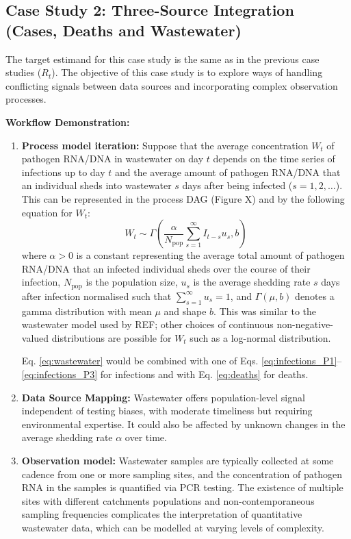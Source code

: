 \documentclass{article}
\begin{document}
\subsection{Case Study 2: Three-Source Integration (Cases, Deaths and Wastewater)}

The target estimand for this case study is the same as in the previous case studies ($R_t$). The objective of this case study is to explore ways of handling conflicting signals between data sources and incorporating complex observation processes.

\textbf{Workflow Demonstration:}
\begin{enumerate}
    \item \textbf{Process model iteration:} 
    Suppose that the average concentration $W_t$ of pathogen RNA/DNA in wastewater on day $t$ depends on the time series of infections up to day $t$ and the average amount of pathogen RNA/DNA that an individual sheds into wastewater $s$ days after being infected ($s=1,2,\ldots$). This can be represented in the process DAG (Figure X) and by the following equation for $W_t$:
    \begin{equation} \label{eq:wastewater}
        W_t \sim \Gamma\left( \frac{\alpha}{N_\mathrm{pop}}\sum_{s=1}^\infty I_{t-s}u_s, b   \right)
    \end{equation}
    where $\alpha>0$ is a constant representing the average total amount of pathogen RNA/DNA that an infected individual sheds over the course of their infection, $N_\mathrm{pop}$ is the population size, $u_s$ is the average shedding rate $s$ days after infection normalised such that $\sum_{s=1}^\infty u_s=1$, and $\Gamma(\mu,b)$ denotes a gamma distribution with mean $\mu$ and shape $b$. This was similar to the wastewater model used by REF; other choices of continuous non-negative-valued distributions are possible for $W_t$ such as a log-normal distribution.

    Eq. \eqref{eq:wastewater} would be combined with one of Eqs. \eqref{eq:infections_P1}--\eqref{eq:infections_P3} for infections and with Eq. \eqref{eq:deaths} for deaths.
    \item \textbf{Data Source Mapping:} Wastewater offers population-level signal independent of testing biases, with moderate timeliness but requiring environmental expertise. It could also be affected by unknown changes in the average shedding rate $\alpha$ over time. 
    \item \textbf{Observation model:} 
   Wastewater samples are typically collected at some cadence from one or more sampling sites, and the concentration of pathogen RNA in the samples is quantified via PCR testing. 
   The existence of multiple sites with different catchments populations and non-contemporaneous sampling frequencies complicates the interpretation of quantitative wastewater data, which can be modelled at varying levels of complexity.  
   

\end{enumerate}
\end{document}
